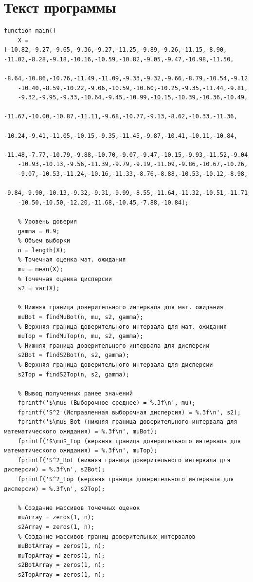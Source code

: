 \documentclass[12pt]{report}
\begin{document}
\section*{Текст программы}
\begin{lstlisting}[mathescape]
function main()
	X = [-10.82,-9.27,-9.65,-9.36,-9.27,-11.25,-9.89,-9.26,-11.15,-8.90, -11.02,-8.28,-9.18,-10.16,-10.59,-10.82,-9.05,-9.47,-10.98,-11.50,
	-8.64,-10.86,-10.76,-11.49,-11.09,-9.33,-9.32,-9.66,-8.79,-10.54,-9.12,
	-10.40,-8.59,-10.22,-9.06,-10.59,-10.60,-10.25,-9.35,-11.44,-9.81,
	-9.32,-9.95,-9.33,-10.64,-9.45,-10.99,-10.15,-10.39,-10.36,-10.49,
	-11.67,-10.00,-10.87,-11.11,-9.68,-10.77,-9.13,-8.62,-10.33,-11.36,
	-10.24,-9.41,-11.05,-10.15,-9.35,-11.45,-9.87,-10.41,-10.11,-10.84,
	-11.48,-7.77,-10.79,-9.88,-10.70,-9.07,-9.47,-10.15,-9.93,-11.52,-9.04,
	-10.93,-10.13,-9.56,-11.39,-9.79,-9.19,-11.09,-9.86,-10.67,-10.26,
	-9.07,-10.53,-11.24,-10.16,-11.33,-8.76,-8.88,-10.53,-10.12,-8.98,
	-9.84,-9.90,-10.13,-9.32,-9.31,-9.99,-8.55,-11.64,-11.32,-10.51,-11.71,
	-10.50,-10.50,-12.20,-11.68,-10.45,-7.88,-10.84];

    % Уровень доверия
	gamma = 0.9;
	% Объем выборки 
	n = length(X);
	% Точечная оценка мат. ожидания
	mu = mean(X);
	% Точечная оценка дисперсии
	s2 = var(X);
	
	% Нижняя граница доверительного интервала для мат. ожидания
	muBot = findMuBot(n, mu, s2, gamma);
	% Верхняя граница доверительного интервала для мат. ожидания
	muTop = findMuTop(n, mu, s2, gamma);
	% Нижняя граница доверительного интервала для дисперсии
	s2Bot = findS2Bot(n, s2, gamma);
	% Верхняя граница доверительного интервала для дисперсии
	s2Top = findS2Top(n, s2, gamma);
	
	% Вывод полученных ранее значений
	fprintf('$\mu$ (Выборочное среднее) = %.3f\n', mu);
	fprintf('S^2 (Исправленная выборочная дисперсия) = %.3f\n', s2);
	fprintf('$\mu$_Bot (нижняя граница доверительного интервала для математического ожидания) = %.3f\n', muBot);
	fprintf('$\mu$_Top (верхняя граница доверительного интервала для математического ожидания) = %.3f\n', muTop);
	fprintf('S^2_Bot (нижняя граница доверительного интервала для дисперсии) = %.3f\n', s2Bot);
	fprintf('S^2_Top (верхняя граница доверительного интервала для дисперсии) = %.3f\n', s2Top);
	
	% Создание массивов точечных оценок
	muArray = zeros(1, n);
	s2Array = zeros(1, n);
	% Создание массивов границ доверительных интервалов
	muBotArray = zeros(1, n);
	muTopArray = zeros(1, n);
	s2BotArray = zeros(1, n);
	s2TopArray = zeros(1, n);
	

\end{lstlisting}
\end{document}
